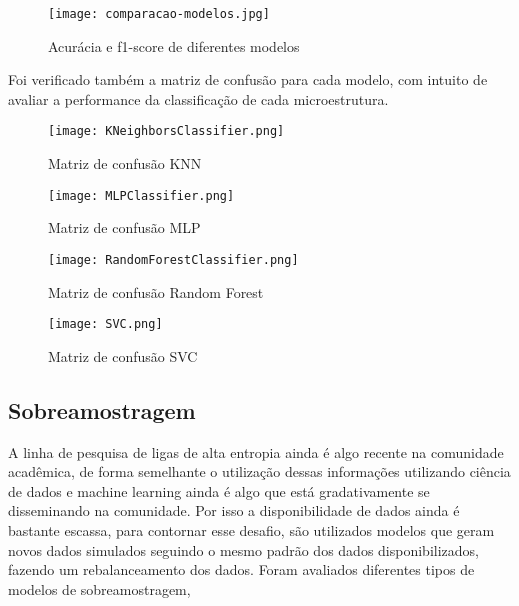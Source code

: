 \begin{figure}[ht]
    \centering
    \texttt{[image: comparacao-modelos.jpg]} 
    \caption{Acurácia e f1-score de diferentes modelos  }
    \label{fig:comparacao_modelos}
\end{figure}
\FloatBarrier


Foi verificado também a matriz de confusão para cada modelo, com intuito de avaliar a performance da classificação de cada microestrutura.


\begin{figure}[ht]
    \centering
    \texttt{[image: KNeighborsClassifier.png]} 
    \caption{Matriz de confusão KNN }
    \label{fig:knn_classifier}
\end{figure}
\FloatBarrier

\begin{figure}[ht]
    \centering
    \texttt{[image: MLPClassifier.png]} 
    \caption{Matriz de confusão MLP }
    \label{fig:mlp_classifier}
\end{figure}
\FloatBarrier

\begin{figure}[ht]
    \centering
    \texttt{[image: RandomForestClassifier.png]} 
    \caption{Matriz de confusão Random Forest  }
    \label{fig:random_forest}
\end{figure}
\FloatBarrier

\begin{figure}[ht]
    \centering
    \texttt{[image: SVC.png]} 
    \caption{Matriz de confusão SVC  }
    \label{fig:svc_classifier}
\end{figure}
\FloatBarrier





\subsection{Sobreamostragem}\label{sec:MAT_MET_SEC_B_SUB_F}

A linha de pesquisa de ligas de alta entropia ainda é algo recente na comunidade acadêmica, de forma semelhante o utilização dessas informações utilizando ciência de dados e machine learning ainda é algo que está gradativamente se disseminando na comunidade. Por isso a disponibilidade de dados ainda é bastante escassa, para contornar esse desafio, são utilizados modelos que geram novos dados simulados seguindo o mesmo padrão dos dados disponibilizados, fazendo um rebalanceamento dos dados. Foram avaliados diferentes tipos de modelos de sobreamostragem, 

